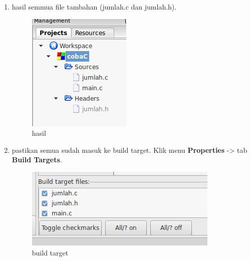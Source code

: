 \documentclass[12pt,]{article}
\begin{document}
\begin{enumerate}
		\item hasil semmua file tambahan (jumlah.c dan jumlah.h).
		\begin{figure}[H]
			\centering
			\includegraphics[width=0.35\linewidth]{images/c_mul_3}
			\caption{hasil}
		\end{figure}
	
		\item pastikan semua sudah masuk ke build target.
		Klik menu \textbf{Properties} -> tab \textbf{Build Targets}.
		\begin{figure}[H]
			\centering
			\includegraphics[width=0.35\linewidth]{images/c_mul_4}
			\caption{build target}
		\end{figure}
	\end{enumerate}
\end{document}

